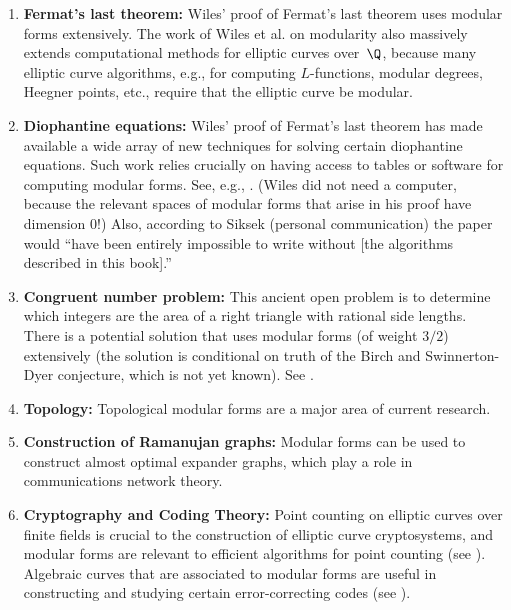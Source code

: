 \begin{enumerate}
\item {\bf Fermat's last theorem:} Wiles' proof \cite{wiles:fermat}
  of Fermat's last theorem
 uses modular forms extensively.  The work
  of Wiles et al. on modularity also massively extends computational
  methods for elliptic curves over~$\Q$, because many elliptic curve algorithms,
  e.g., for computing $L$-functions, modular degrees, Heegner points,
  etc., require that the elliptic curve be modular.


\item {\bf Diophantine equations:} Wiles'
  proof of Fermat's last theorem has made available a wide array of
  new techniques for solving certain diophantine equations.  
Such work
  relies crucially on having access to tables or software for
  computing modular forms. See, e.g., \cite{darmon:eps,
    merel:diophantine, chen:dio, siksekcremona}.  (Wiles did not need
  a computer, because the relevant spaces of modular forms that arise
  in his proof have dimension $0$!)  Also, according to Siksek
  (personal communication) the paper \cite{siksek:dio} would ``have
  been entirely impossible to write without [the algorithms described
  in this book].''


\item {\bf Congruent number problem:} This ancient open
  problem is to determine which integers are the area of a right
  triangle with rational side lengths.  There is a potential solution
  that uses modular forms (of weight $3/2$) extensively (the solution
  is conditional on truth of the Birch and Swinnerton-Dyer
  conjecture, which is not yet known). See \cite{koblitz:cong}.

\item {\bf Topology:} Topological modular forms are a major area
  of current research.

\item {\bf Construction of Ramanujan graphs:} Modular forms can be
  used to construct almost optimal expander graphs, which play
  a role in communications network theory.

\item {\bf Cryptography and Coding Theory:} Point counting on elliptic
  curves over finite fields is crucial to the construction of elliptic
  curve cryptosystems, and modular forms are relevant to efficient
  algorithms for point counting (see \cite{elkies:ffield}).  Algebraic
  curves that are associated to modular forms are useful in constructing and
  studying certain error-correcting codes (see \cite{ebeling}).


\end{enumerate}
